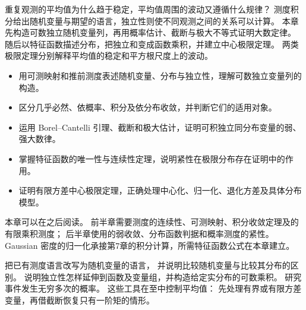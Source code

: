 
\begin{chapterabstract}
重复观测的平均值为什么趋于稳定，平均值周围的波动又遵循什么规律？
测度积分给出随机变量与期望的语言，独立性则使不同观测之间的关系可以计算。
本章先构造可数独立随机变量列，再用概率估计、截断与极大不等式证明大数定律。
随后以特征函数描述分布，把独立和变成函数乘积，并建立中心极限定理。
两类极限定理分别解释平均值的稳定和平方根尺度上的波动。
\end{chapterabstract}

\begin{learninggoals}
\begin{itemize}
\item\label{b1:item:30-goal-model}用可测映射和推前测度表述随机变量、分布与独立性，理解可数独立变量列的构造。
\item\label{b1:item:30-goal-modes}区分几乎必然、依概率、积分及依分布收敛，并判断它们的适用对象。
\item\label{b1:item:30-goal-lln}运用 Borel--Cantelli 引理、截断和极大估计，证明可积独立同分布变量的弱、强大数律。
\item\label{b1:item:30-goal-characteristic}掌握特征函数的唯一性与连续性定理，说明紧性在极限分布存在证明中的作用。
\item\label{b1:item:30-goal-clt}证明有限方差中心极限定理，正确处理中心化、归一化、退化方差及具体分布模型。
\end{itemize}
\end{learninggoals}

本章可以在之后阅读。
前半章需要测度的连续性、可测映射、积分收敛定理及的有限乘积测度；
后半章使用的弱收敛、分布函数判据和概率测度的紧性。
Gaussian 密度的归一化承接第7章的积分计算，所需特征函数公式在本章建立。

\ProseParagraphBreak

把已有测度语言改写为随机变量的语言，
并说明比较随机变量与比较其分布的区别。
说明独立性怎样延伸到函数及变量组，并构造给定实分布的可数乘积。
研究事件发生无穷多次的概率。
这些工具在至中控制平均值：
先处理有界或有限方差变量，再借截断恢复只有一阶矩的情形。

\ProseParagraphBreak

